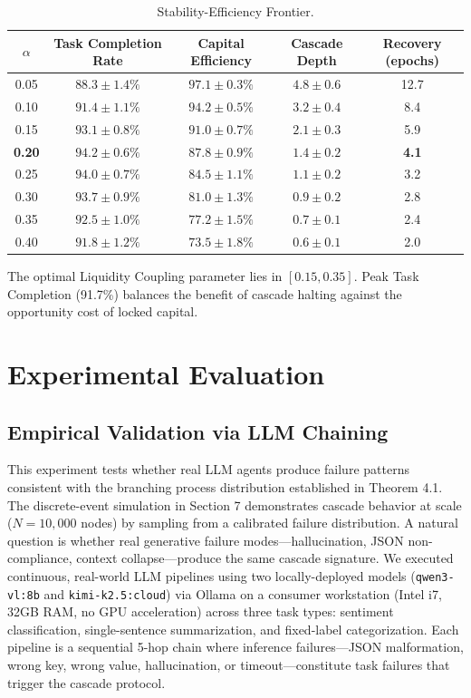 \documentclass[11pt]{article}
\begin{document}
\begin{table}[h]
\centering
\begin{tabular}{ccccc}
\toprule
$\alpha$ & Task Completion Rate & Capital Efficiency & Cascade Depth & Recovery (epochs) \\
\midrule
0.05 & $88.3 \pm 1.4\%$ & $97.1 \pm 0.3\%$ & $4.8 \pm 0.6$ & 12.7 \\
0.10 & $91.4 \pm 1.1\%$ & $94.2 \pm 0.5\%$ & $3.2 \pm 0.4$ & 8.4 \\
0.15 & $93.1 \pm 0.8\%$ & $91.0 \pm 0.7\%$ & $2.1 \pm 0.3$ & 5.9 \\
\textbf{0.20} & \textbf{$94.2 \pm 0.6\%$} & \textbf{$87.8 \pm 0.9\%$} & \textbf{$1.4 \pm 0.2$} & \textbf{4.1} \\
0.25 & $94.0 \pm 0.7\%$ & $84.5 \pm 1.1\%$ & $1.1 \pm 0.2$ & 3.2 \\
0.30 & $93.7 \pm 0.9\%$ & $81.0 \pm 1.3\%$ & $0.9 \pm 0.2$ & 2.8 \\
0.35 & $92.5 \pm 1.0\%$ & $77.2 \pm 1.5\%$ & $0.7 \pm 0.1$ & 2.4 \\
0.40 & $91.8 \pm 1.2\%$ & $73.5 \pm 1.8\%$ & $0.6 \pm 0.1$ & 2.0 \\
\bottomrule
\end{tabular}
\caption{Stability-Efficiency Frontier.}
\end{table}

The optimal Liquidity Coupling parameter lies in $[0.15, 0.35]$. Peak Task Completion (91.7\%) balances the benefit of cascade halting against the opportunity cost of locked capital.

\section{Experimental Evaluation}

\subsection{Empirical Validation via LLM Chaining}

This experiment tests whether real LLM agents produce failure patterns consistent with the branching process distribution established in Theorem 4.1. The discrete-event simulation in Section 7 demonstrates cascade behavior at scale ($N=10{,}000$ nodes) by sampling from a calibrated failure distribution. A natural question is whether real generative failure modes---hallucination, JSON non-compliance, context collapse---produce the same cascade signature. We executed continuous, real-world LLM pipelines using two locally-deployed models (\texttt{qwen3-vl:8b} and \texttt{kimi-k2.5:cloud}) via Ollama on a consumer workstation (Intel i7, 32GB RAM, no GPU acceleration) across three task types: sentiment classification, single-sentence summarization, and fixed-label categorization. Each pipeline is a sequential 5-hop chain where inference failures---JSON malformation, wrong key, wrong value, hallucination, or timeout---constitute task failures that trigger the cascade protocol.
\end{document}
